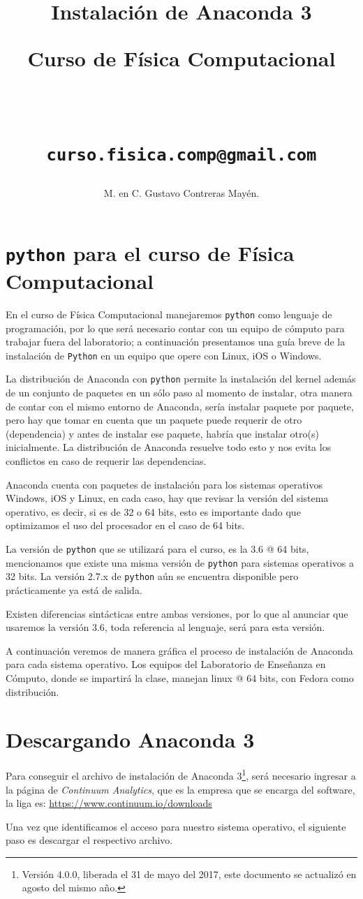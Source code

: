 \documentclass[12pt]{article}
\author{M. en C. Gustavo Contreras Mayén.}
\title{Instalación de Anaconda 3 \\ \begin{Large} Curso de Física Computacional\end{Large} \\
\begin{small}
\texttt{curso.fisica.comp@gmail.com}
\end{small}}
\date{ }
\begin{document}
\maketitle
\fontsize{14}{14}\selectfont
\section{\texttt{python} para el curso de Física Computacional}
En el curso de Física Computacional manejaremos \texttt{python} como lenguaje de programación, por lo que será necesario contar con un equipo de cómputo para trabajar fuera del laboratorio; a continuación presentamos una guía breve de la instalación de \texttt{Python} en un equipo que opere con Linux, iOS o Windows.
\par
La distribución de Anaconda con \texttt{python} permite la instalación del kernel además de un conjunto de paquetes en un sólo paso al momento de instalar, otra manera de contar con el mismo entorno de Anaconda, sería instalar paquete por paquete, pero hay que tomar en cuenta que un paquete puede requerir de otro (dependencia) y antes de instalar ese paquete, habría que instalar otro(s) inicialmente. La distribución de Anaconda resuelve todo esto y nos evita los conflictos en caso de requerir las dependencias.
\par
Anaconda cuenta con paquetes de instalación para los sistemas operativos Windows, iOS y Linux, en cada caso, hay que revisar la versión del sistema operativo, es decir, si es de 32 o 64 bits, esto es importante dado que optimizamos el uso del procesador en el caso de 64 bits.
\par
La versión de \texttt{python} que se utilizará para el curso, es la 3.6 @ 64 bits, mencionamos que existe una misma versión de \texttt{python} para sistemas operativos a 32 bits. La versión 2.7.x de \texttt{python} aún se encuentra disponible pero prácticamente ya está de salida.
\par
Existen diferencias sintácticas entre ambas versiones, por lo que al anunciar que usaremos la versión 3.6, toda referencia al lenguaje, será para esta versión.
\par
A continuación veremos de manera gráfica el proceso de instalación de Anaconda para cada sistema operativo. Los equipos del Laboratorio de Enseñanza en Cómputo, donde se impartirá la clase, manejan linux @ 64 bits, con Fedora como distribución.
\section{Descargando Anaconda 3}
Para conseguir el archivo de instalación de Anaconda 3\footnote{Versión 4.0.0, liberada el 31 de mayo del 2017, este documento se actualizó en agosto del mismo año.}, será necesario ingresar a la página de \emph{Continuum Analytics}, que es la empresa que se encarga del software, la liga es: \url{https://www.continuum.io/downloads}
\par
Una vez que identificamos el acceso para nuestro sistema operativo, el siguiente paso es descargar el respectivo archivo.
\end{document}
